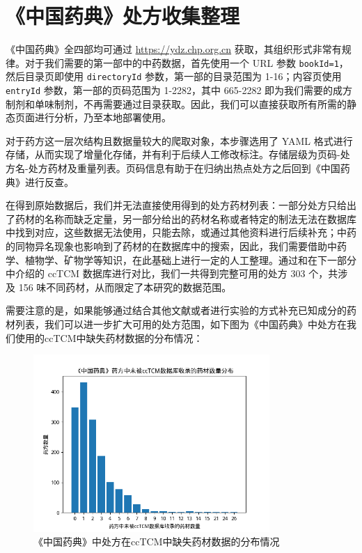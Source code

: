 \section{《中国药典》处方收集整理}

《中国药典》全四部均可通过 \url{https://ydz.chp.org.cn} 获取，其组织形式非常有规律。对于我们需要的第一部中的中药数据，首先使用一个 URL 参数 \texttt{bookId=1}，然后目录页即使用 \texttt{directoryId} 参数，第一部的目录范围为 1-16；内容页使用 \texttt{entryId} 参数，第一部的页码范围为 1-2282，其中 665-2282 即为我们需要的成方制剂和单味制剂，不再需要通过目录获取。因此，我们可以直接获取所有所需的静态页面进行分析，乃至本地部署使用。

对于药方这一层次结构且数据量较大的爬取对象，本步骤选用了 YAML 格式进行存储，从而实现了增量化存储，并有利于后续人工修改标注。存储层级为页码-处方名-处方药材及重量列表。页码信息有助于在归纳出热点处方之后回到《中国药典》进行反查。

在得到原始数据后，我们并无法直接使用得到的处方药材列表：一部分处方只给出了药材的名称而缺乏定量，另一部分给出的药材名称或者特定的制法无法在数据库中找到对应，这些数据无法使用，只能去除，或通过其他资料进行后续补充；中药的同物异名现象也影响到了药材的在数据库中的搜索，因此，我们需要借助中药学、植物学、矿物学等知识，在此基础上进行一定的人工整理。通过和在下一部分中介绍的 ccTCM 数据库进行对比，我们一共得到完整可用的处方 303 个，共涉及 156 味不同药材，从而限定了本研究的数据范围。

需要注意的是，如果能够通过结合其他文献或者进行实验的方式补充已知成分的药材列表，我们可以进一步扩大可用的处方范围，如下图为《中国药典》中处方在我们使用的ccTCM中缺失药材数据的分布情况：

\begin{figure}[H]
  \centering
  \includegraphics[width=0.8\textwidth]{figures/unlisted_medicinals_distribution}
  \caption{《中国药典》中处方在ccTCM中缺失药材数据的分布情况}
  \label{fig:missing_herbs}
\end{figure}

